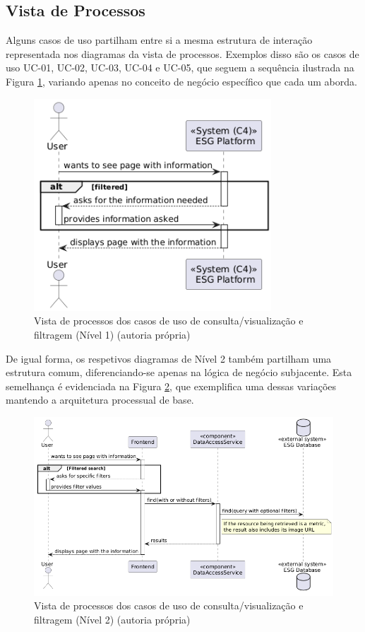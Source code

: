 \subsection{Vista de Processos}
\label{subsec:process_view}

Alguns casos de uso partilham entre si a mesma estrutura de interação representada nos diagramas da vista de processos. Exemplos disso são os casos de uso UC-01, UC-02, UC-03, UC-04 e UC-05, que seguem a sequência ilustrada na Figura \ref{fig:UC12345-lvl1}, variando apenas no conceito de negócio específico que cada um aborda.

\begin{figure}[h]
\centering
\includegraphics[width=3.5in]{frontmatter/assets/diagrams/Process Views/UC12345-lvl1.png}
\caption{Vista de processos dos casos de uso de consulta/visualização e filtragem (Nível 1) (autoria própria)}
\label{fig:UC12345-lvl1}
\end{figure}

De igual forma, os respetivos diagramas de Nível 2 também partilham uma estrutura comum, diferenciando-se apenas na lógica de negócio subjacente. Esta semelhança é evidenciada na Figura \ref{fig:UC12345-lvl2}, que exemplifica uma dessas variações mantendo a arquitetura processual de base.

\begin{figure}[H]
\centering
\includegraphics[width=5in]{frontmatter/assets/diagrams/Process Views/UC12345-lvl2.png}
\caption{Vista de processos dos casos de uso de consulta/visualização e filtragem (Nível 2) (autoria própria)}
\label{fig:UC12345-lvl2}
\end{figure}

